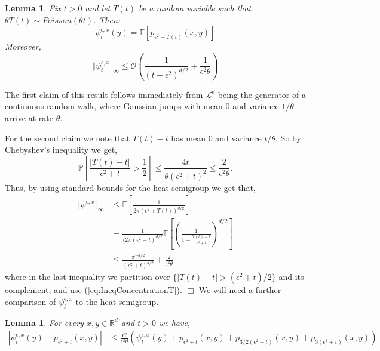 \documentclass[12pt]{article}
\newenvironment {proof}{{\noindent\bf Proof }}{\hfill $\Box$ \medskip}
\newtheorem{lemma}[theorem]{Lemma}
\newcommand{\IP}{\mathbb P}
\newcommand{\IE}{\mathbb E}
\begin{document}
\begin{lemma} \label{PsiBoundHS}
Fix $t>0$ and let $T(t)$ be a random variable such that $\theta T(t) \sim Poisson(\theta t)$. Then:
\[ \psi^{\epsilon,x}_t(y) = \mathbb{E}\left[ p_{\epsilon^2+T(t)}(x,y)\right] \]
Moreover,
\[ \Vert \psi^{\epsilon,x}_t \Vert_\infty \leq \mathcal{O}\left( \frac{1}{(t+\epsilon^2)^{d/2}} + \frac{1}{\epsilon^2 \theta} \right) \]
\end{lemma}
\begin{proof}
The first claim of this result follows immediately from $\mathcal{L}^\theta$ being the generator of a continuous random walk, where Gaussian jumps with mean $0$ and variance $1/\theta$ arrive at rate $\theta$.

For the second claim we note that $T(t)-t$ has mean $0$ and variance $t/\theta$.  So by Chebyshev's inequality we get,
\begin{equation}
\IP\left[  \frac{|T(t)-t|}{\epsilon^2+t} > \frac{1}{2} \right] \leq \frac{4t}{\theta(\epsilon^2+t)^2} \leq \frac{2}{\epsilon^2 \theta}. \label{eq:IneqConcentrationT}
\end{equation}
Thus, by using standard bounds for the heat semigroup we get that,
\begin{align*}
\Vert \psi^{\epsilon,x} \Vert_\infty & \leq \IE\left[  \frac{1}{2 \pi (\epsilon^2+T(t))^{d/2}}\right] \\ & = \frac{1}{(2 \pi(\epsilon^2+t)^{d/2}} \IE\left[\left(\frac{1}{1+\frac{T(t)-t}{\epsilon^2+t}} \right)^{d/2} \right] \\ &\leq \frac{\pi^{-d/2}}{(\epsilon^2+t)^{d/2}} + \frac{2}{\epsilon^2 \theta}
\end{align*}
where in the last inequality we partition over $\{ |T(t)-t| > (\epsilon^2+t)/2\}$ and its complement, and use (\ref{eq:IneqConcentrationT}).
\end{proof}
We will need a further comparison of $\psi_t^{\epsilon,x}$ to the heat semigroup.
\begin{lemma}
For every $x,y \in \mathbb{R}^d$ and $t>0$ we have,
\begin{align*}
|\psi_t^{\epsilon,x}(y) - p_{\epsilon^2+t}(x,y)| &\leq \frac{C}{\epsilon^2 \theta}\left(\psi_t^{\epsilon,x}(y) + p_{\epsilon^2+t}(x,y) + p_{3/2(\epsilon^2+t)}(x,y)+p_{3(\epsilon^2+t)}(x,y) \right)
\end{align*} \label{Lemma:BoundPsiHS2}
\end{lemma}
\end{document}
